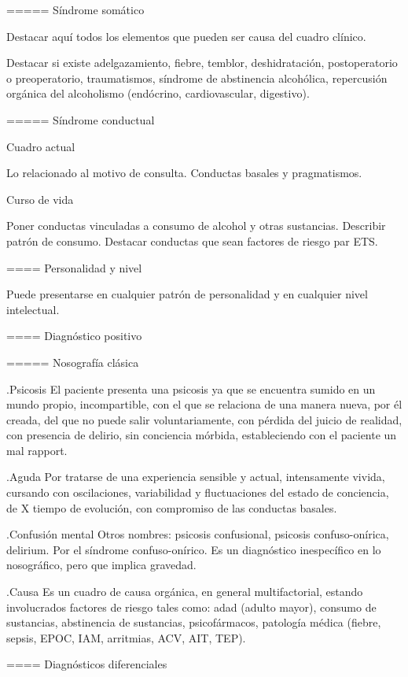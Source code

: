 \documentclass[encares.tex]{subfiles}
\begin{document}
===== Síndrome somático

Destacar aquí todos los elementos que pueden ser causa del cuadro clínico.

Destacar si existe adelgazamiento, fiebre, temblor, deshidratación, postoperatorio o preoperatorio, traumatismos, síndrome de abstinencia alcohólica, repercusión orgánica del alcoholismo (endócrino, cardiovascular, digestivo).

===== Síndrome conductual

Cuadro actual

Lo relacionado al motivo de consulta. Conductas basales y pragmatismos.

Curso de vida

Poner conductas vinculadas a consumo de alcohol y otras sustancias. Describir patrón de consumo. Destacar conductas que sean factores de riesgo par ETS.

==== Personalidad y nivel

Puede presentarse en cualquier patrón de personalidad y en cualquier nivel intelectual.

==== Diagnóstico positivo

===== Nosografía clásica

.Psicosis
El paciente presenta una psicosis ya que se encuentra sumido en un mundo propio, incompartible, con el que se relaciona de una manera nueva, por él creada, del que no puede salir voluntariamente, con pérdida del juicio de realidad, con presencia de delirio, sin conciencia mórbida, estableciendo con el paciente un mal rapport.

.Aguda
Por tratarse de una experiencia sensible y actual, intensamente vivida, cursando con oscilaciones, variabilidad y fluctuaciones del estado de conciencia, de X tiempo de evolución, con compromiso de las conductas basales.

.Confusión mental
Otros nombres: psicosis confusional, psicosis confuso-onírica, delirium.
Por el síndrome confuso-onírico. Es un diagnóstico inespecífico en lo nosográfico, pero que implica gravedad.

.Causa
Es un cuadro de causa orgánica, en general multifactorial, estando involucrados factores de riesgo tales como: adad (adulto mayor), consumo de sustancias, abstinencia de sustancias, psicofármacos, patología médica (fiebre, sepsis, EPOC, IAM, arritmias, ACV, AIT, TEP).

==== Diagnósticos diferenciales
\end{document}
